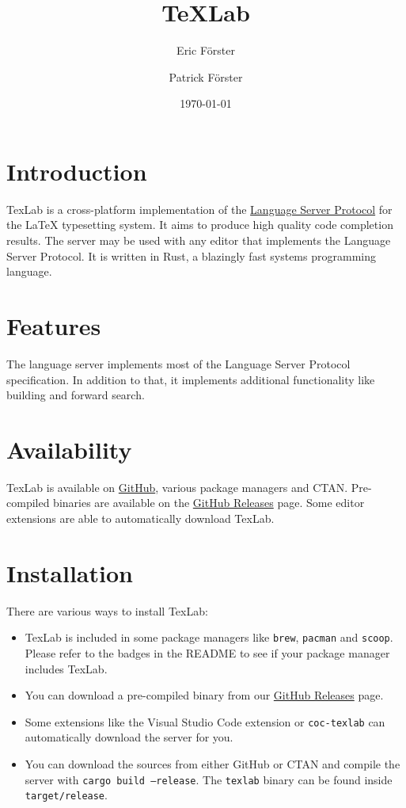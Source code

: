 \documentclass{article}
\date{\today}
\author{Eric Förster \and Patrick Förster}
\title{\TeX{}Lab}
\begin{document}
\maketitle{}

\section{Introduction}

TexLab is a cross-platform implementation of the
\href{https://microsoft.github.io/language-server-protocol/specifications/specification-current/}{Language Server Protocol}
for the \LaTeX{} typesetting system.
It aims to produce high quality code completion results.
The server may be used with any editor that implements the Language Server Protocol.
It is written in Rust, a blazingly fast systems programming language.

\section{Features}

The language server implements most of the Language Server Protocol specification.
In addition to that, it implements additional functionality like
building and forward search.

\section{Availability}

TexLab is available on \href{https://github.com/latex-lsp/texlab}{GitHub},
various package managers and CTAN\@. 
Pre-compiled binaries are available on the 
\href{https://github.com/latex-lsp/texlab/releases}{GitHub Releases} page.
Some editor extensions are able to automatically download TexLab.

\section{Installation}

There are various ways to install TexLab:
\begin{itemize}
    \item 
        TexLab is included in some package managers like \texttt{brew},
        \texttt{pacman} and \texttt{scoop}.
        Please refer to the badges in the README to see if your package manager
        includes TexLab.
    \item
        You can download a pre-compiled binary from our 
        \href{https://github.com/latex-lsp/texlab/releases}{GitHub Releases} page.
    \item
        Some extensions like the Visual Studio Code extension or
        \texttt{coc-texlab} can automatically download the server for you.
    \item
        You can download the sources from either GitHub or CTAN
        and compile the server with \texttt{cargo build --release}.
        The \texttt{texlab} binary can be found inside \texttt{target/release}.    
\end{itemize}
\end{document}
